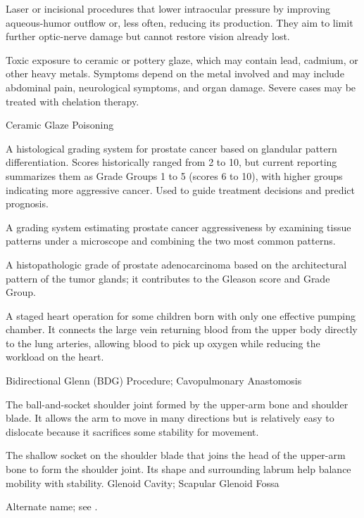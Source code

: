  Laser or incisional procedures that lower intraocular pressure by improving aqueous-humor outflow or, less often, reducing its production. They aim to limit further optic-nerve damage but cannot restore vision already lost.

 Toxic exposure to ceramic or pottery glaze, which may contain lead, cadmium, or other heavy metals. Symptoms depend on the metal involved and may include abdominal pain, neurological symptoms, and organ damage. Severe cases may be treated with chelation therapy.

\synonyms
Ceramic Glaze Poisoning

 A histological grading system for prostate cancer based on glandular pattern differentiation. Scores historically ranged from 2 to 10, but current reporting summarizes them as Grade Groups 1 to 5 (scores 6 to 10), with higher groups indicating more aggressive cancer. Used to guide treatment decisions and predict prognosis.


 A grading system estimating prostate cancer aggressiveness by examining tissue patterns under a microscope and combining the two most common patterns.

 A histopathologic grade of prostate adenocarcinoma based on the architectural pattern of the tumor glands; it contributes to the Gleason score and Grade Group.

 A staged heart operation for some children born with only one effective pumping chamber. It connects the large vein returning blood from the upper body directly to the lung arteries, allowing blood to pick up oxygen while reducing the workload on the heart.

\synonyms
Bidirectional Glenn (BDG) Procedure; Cavopulmonary Anastomosis

 The ball-and-socket shoulder joint formed by the upper-arm bone and shoulder blade. It allows the arm to move in many directions but is relatively easy to dislocate because it sacrifices some stability for movement.

 The shallow socket on the shoulder blade that joins the head of the upper-arm bone to form the shoulder joint. Its shape and surrounding labrum help balance mobility with stability.
\synonyms
Glenoid Cavity; Scapular Glenoid Fossa

 Alternate name; see .

